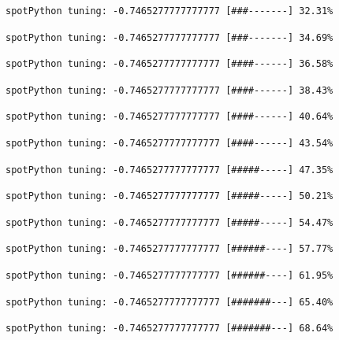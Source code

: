 \documentclass[
  letterpaper,
  DIV=11,
  numbers=noendperiod]{scrreprt}
\begin{document}
\begin{verbatim}
spotPython tuning: -0.7465277777777777 [###-------] 32.31% 
\end{verbatim}

\begin{verbatim}
spotPython tuning: -0.7465277777777777 [###-------] 34.69% 
\end{verbatim}

\begin{verbatim}
spotPython tuning: -0.7465277777777777 [####------] 36.58% 
\end{verbatim}

\begin{verbatim}
spotPython tuning: -0.7465277777777777 [####------] 38.43% 
\end{verbatim}

\begin{verbatim}
spotPython tuning: -0.7465277777777777 [####------] 40.64% 
\end{verbatim}

\begin{verbatim}
spotPython tuning: -0.7465277777777777 [####------] 43.54% 
\end{verbatim}

\begin{verbatim}
spotPython tuning: -0.7465277777777777 [#####-----] 47.35% 
\end{verbatim}

\begin{verbatim}
spotPython tuning: -0.7465277777777777 [#####-----] 50.21% 
\end{verbatim}

\begin{verbatim}
spotPython tuning: -0.7465277777777777 [#####-----] 54.47% 
\end{verbatim}

\begin{verbatim}
spotPython tuning: -0.7465277777777777 [######----] 57.77% 
\end{verbatim}

\begin{verbatim}
spotPython tuning: -0.7465277777777777 [######----] 61.95% 
\end{verbatim}

\begin{verbatim}
spotPython tuning: -0.7465277777777777 [#######---] 65.40% 
\end{verbatim}

\begin{verbatim}
spotPython tuning: -0.7465277777777777 [#######---] 68.64% 
\end{verbatim}
\end{document}

